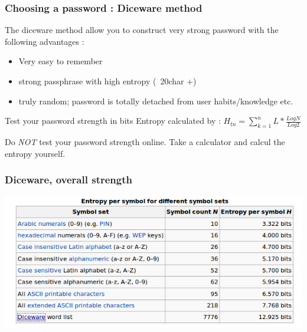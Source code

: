 \begin{frame}
\frametitle{Choosing a password : Diceware method}
The diceware method allow you to construct very strong password with the
following advantages :
\begin{itemize}
\item Very easy to remember
\item strong passphrase with high entropy (~20char +)
\item truly random; password is totally detached from user habits/knowledge
etc.
\end{itemize}
\begin{block}{Test your password strength in bits}
Entropy calculated by : $H_{tn}=\sum_{k=1}^nL*\frac{Log N}{Log 2}$
\end{block}
Do \emph{NOT} test your password strength online.
Take a calculator and calcul the entropy yourself.
\end{frame}
\begin{frame}
\frametitle{Diceware, overall strength}
\includegraphics[width=0.8\linewidth]{./materials/diceware}
\end{frame}
